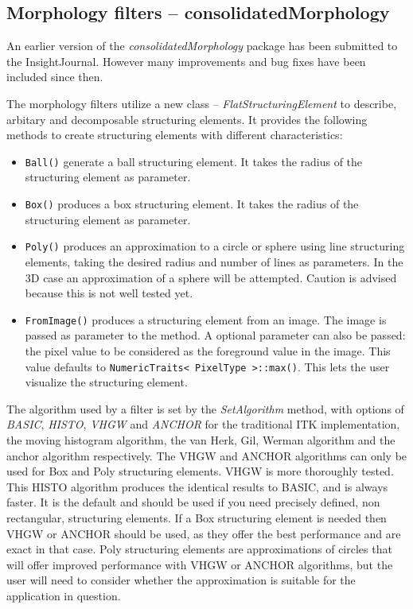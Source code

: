 \documentclass{InsightArticle}
\begin{document}
\subsection{Morphology filters -- consolidatedMorphology}
An earlier version of the {\em consolidatedMorphology} package has
been submitted to the InsightJournal. However many improvements and
bug fixes have been included since then.

The morphology filters utilize a new class -- {\em
FlatStructuringElement} to describe, arbitary and decomposable
structuring elements. It provides the following methods to create
structuring elements with different characteristics:
\begin{itemize}
  \item \verb$Ball()$ generate a ball structuring element. It takes the 
	radius of the structuring element as parameter.
  \item \verb$Box()$ produces a box structuring element. It takes the radius 
	of the structuring element as parameter.
  \item \verb$Poly()$ produces an approximation to a circle or sphere using 
	line structuring elements, taking the desired radius and number of 
	lines as parameters. In the 3D case an approximation of a sphere will 
	be attempted. Caution is advised because this is not well tested yet.
  \item \verb$FromImage()$ produces a structuring element from an image. The image is passed
as parameter to the method. A optional parameter can also be passed: the pixel value
to be considered as the foreground value in the image. This value defaults to
\verb$NumericTraits< PixelType >::max()$. This lets the user visualize the structuring element.
\end{itemize}

The algorithm used by a filter is set by the {\em SetAlgorithm}
method, with options of {\em BASIC}, {\em HISTO}, {\em VHGW} and {\em
ANCHOR} for the traditional ITK implementation, the moving histogram
algorithm, the van Herk, Gil, Werman algorithm and the anchor
algorithm respectively. The VHGW and ANCHOR algorithms can only be
used for Box and Poly structuring elements. VHGW is more thoroughly
tested. This HISTO algorithm produces the identical results to BASIC,
and is always faster. It is the default and should be used if you need
precisely defined, non rectangular, structuring elements. If a Box
structuring element is needed then VHGW or ANCHOR should be used, as
they offer the best performance and are exact in that case. Poly
structuring elements are approximations of circles that will offer
improved performance with VHGW or ANCHOR algorithms, but the user will
need to consider whether the approximation is suitable for the
application in question.
\end{document}

